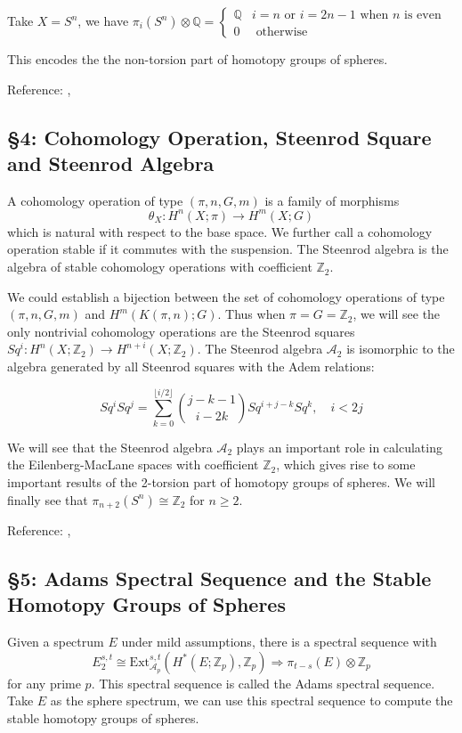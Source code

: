 \documentclass[12pt, reqno]{amsart}
\theoremstyle{definition}
\theoremstyle{remark}
\numberwithin{equation}{section}
\begin{document}
{Take $X=S^n$, we have $\pi_i(S^n) \otimes \mathbb{Q} = \begin{cases}\mathbb{Q} & i=n \text{ or } i=2n-1 \text{ when } n \text{ is even}\\
0 & \text{ otherwise}\end{cases}$

This encodes the the non-torsion part of homotopy groups of spheres.

Reference: \cite{May11}, \cite{HatSS}

\subsection*{\textbf{§4: Cohomology Operation, Steenrod Square and Steenrod Algebra}}

A cohomology operation of type $(\pi, n, G, m)$ is a family of morphisms \[ \theta_X: H^n(X; \pi) \to H^m(X; G) \] which is natural with respect to the base space. We further call a cohomology operation stable if it commutes with the suspension. The Steenrod algebra is the algebra of stable cohomology operations with coefficient $\mathbb{Z}_2$.

We could establish a bijection between the set of cohomology operations of type $(\pi, n, G, m)$ and $H^m(K(\pi, n); G)$. Thus when $\pi=G=\mathbb{Z}_2$, we will see the only nontrivial cohomology operations are the Steenrod squares $Sq^i: H^n(X; \mathbb{Z}_2) \to H^{n+i}(X; \mathbb{Z}_2)$. The Steenrod algebra $\mathcal{A}_2$ is isomorphic to the algebra generated by all Steenrod squares with the Adem relations: 

\[ Sq^i Sq^j = \sum_{k=0}^{\lfloor i/2 \rfloor} \binom{j-k-1}{i-2k} Sq^{i+j-k} Sq^k, \quad i<2j \]

We will see that the Steenrod algebra $\mathcal{A}_2$ plays an important role in calculating the Eilenberg-MacLane spaces with coefficient $\mathbb{Z}_2$, which gives rise to some important results of the 2-torsion part of homotopy groups of spheres. We will finally see that $\pi_{n+2}(S^n) \cong \mathbb{Z}_2$ for $n \geq 2$.

Reference: \cite{Hat02}, \cite{MT08}

\subsection*{\textbf{§5: Adams Spectral Sequence and the Stable Homotopy Groups of Spheres}}

Given a spectrum $E$ under mild assumptions, there is a spectral sequence with
\[ E_2^{s,t} \cong \mathrm{Ext}^{s,t}_{\mathcal{A}_p}(H^*(E; \mathbb{Z}_p), \mathbb{Z}_p) \Rightarrow \pi_{t-s}(E) \otimes \mathbb{Z}_p \]
for any prime $p$. This spectral sequence is called the Adams spectral sequence. Take $E$ as the sphere spectrum, we can use this spectral sequence to compute the stable homotopy groups of spheres.

}
\end{document}

